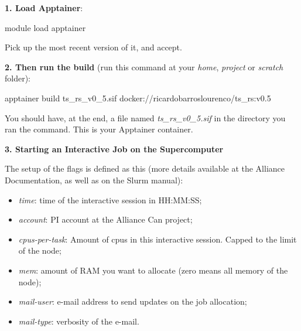 \documentclass[
]{book}
\newenvironment{Shaded}{\begin{snugshade}}{\end{snugshade}}
\newcommand{\AttributeTok}[1]{\textcolor[rgb]{0.77,0.63,0.00}{#1}}
\newcommand{\ExtensionTok}[1]{#1}
\newcommand{\NormalTok}[1]{#1}
\newcommand{\OperatorTok}[1]{\textcolor[rgb]{0.81,0.36,0.00}{\textbf{#1}}}
\providecommand{\tightlist}{%
  \setlength{\itemsep}{0pt}\setlength{\parskip}{0pt}}
\begin{document}
\textbf{1. Load Apptainer}:

\begin{Shaded}
\begin{Highlighting}[]
\ExtensionTok{module}\NormalTok{ load apptainer}
\end{Highlighting}
\end{Shaded}

Pick up the most recent version of it, and accept.

\textbf{2. Then run the build} (run this command at your \emph{home}, \emph{project} or \emph{scratch} folder):

\begin{Shaded}
\begin{Highlighting}[]
\ExtensionTok{apptainer}\NormalTok{ build ts\_rs\_v0\_5.sif docker://ricardobarroslourenco/ts\_rs:v0.5}
\end{Highlighting}
\end{Shaded}

You should have, at the end, a file named \emph{ts\_rs\_v0\_5.sif} in the
directory you ran the command. This is your Apptainer container.

\textbf{3. Starting an Interactive Job on the Supercomputer}

\begin{Shaded}
\end{Shaded}

The setup of the flags is defined as this (more details available at the Alliance Documentation, as well as on the Slurm manual):

\begin{itemize}
\tightlist
\item
  \emph{time}: time of the interactive session in HH:MM:SS;
\item
  \emph{account}: PI account at the Alliance Can project;
\item
  \emph{cpus-per-task}: Amount of cpus in this interactive session. Capped to the limit of the node;
\item
  \emph{mem}: amount of RAM you want to allocate (zero means all memory of the node);
\item
  \emph{mail-user}: e-mail address to send updates on the job allocation;
\item
  \emph{mail-type}: verbosity of the e-mail.
\end{itemize}
\end{document}
